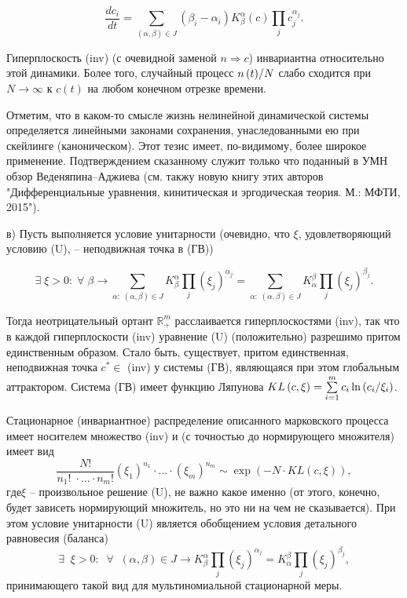 \begin{remark}
\[\tag{ГВ}
\frac{dc_i }{dt}=\sum\limits_{\left( {\alpha ,\beta } \right)\in J} {\left( 
{\beta _i -\alpha _i } \right)K_\beta ^\alpha \left( c \right)\prod\limits_j 
{c_j^{\alpha _j } } } .
\]

Гиперплоскость (inv) (с очевидной заменой $n\Rightarrow c$) инвариантна относительно этой динамики.   Более того, случайный процесс ${n\left( t \right)} \mathord{\left/ {\vphantom 
{{n\left( t \right)} N}} \right. \kern-\nulldelimiterspace} N$ слабо сходится при $N\to \infty$ 
 к $c\left( t \right)$  на любом конечном отрезке времени. 

Отметим, что в каком-то смысле жизнь нелинейной динамической 
системы определяется линейными законами сохранения, унаследованными ею при 
скейлинге (каноническом). Этот тезис имеет, по-видимому, более широкое 
применение. Подтверждением сказанному служит только что поданный в УМН обзор 
Веденяпина--Аджиева (см. такжу новую книгу этих авторов "Дифференциальные уравнения, кинитическая и эргодическая теория. М.: МФТИ, 2015"). 

в) Пусть выполняется условие унитарности (очевидно, что $\xi $, удовлетворяющий условию (U), -- неподвижная точка в (ГВ))

\[\tag{U}
\exists \;\xi >0:\;\forall \;\beta \to \sum\limits_{\alpha :\;\left( 
{\alpha ,\beta } \right)\in J} {K_\beta ^\alpha \prod\limits_j {\left( {\xi 
_j } \right)^{\alpha _j }} } =\sum\limits_{\alpha :\;\left( {\alpha ,\beta } 
\right)\in J} {K_\alpha ^\beta \prod\limits_j {\left( {\xi _j } 
\right)^{\beta _j }} } .
\]

Тогда неотрицательный ортант ${\mathbb R}_+^m $ расслаивается гиперплоскостями (inv), так что в каждой гиперплоскости (inv) уравнение (U) (положительно) разрешимо притом единственным образом. Стало быть, существует, притом единственная, неподвижная точка $c^\ast \in$ (inv) у системы (ГВ), являющаяся при этом глобальным аттрактором. Система (ГВ) имеет функцию Ляпунова $KL\left( {c,\xi } 
\right)=\sum\limits_{i=1}^m {c_i \ln \left( {{c_i } \mathord{\left/ 
{\vphantom {{c_i } {\xi _i }}} \right. \kern-\nulldelimiterspace} {\xi _i }} 
\right)} $.

Стационарное (инвариантное) распределение описанного марковского процесса имеет носителем множество (inv) и (с точностью до нормирующего множителя) имеет вид
\[
\frac{N!}{n_1 !\;\cdot \ldots \cdot n_m !}\left( \xi _1 \right)^{n_1 }\cdot \ldots\cdot \left( \xi _m  \right)^{n_m }\sim \exp \left( {-N\cdot KL\left( 
{c,\xi } \right)} \right),
\]
$где \xi $ -- произвольное решение (U), не важно какое именно (от этого, конечно, будет зависеть нормирующий множитель, но это ни на чем не сказывается). При этом условие унитарности (U) является обобщением условия детального равновесия (баланса) 
\[
\exists \;\;\xi >0:\;\;\forall \;\;\left( {\alpha ,\beta } \right)\in J\to 
K_\beta ^\alpha \prod\limits_j {\left( {\xi _j } \right)^{\alpha _j }} 
=K_\alpha ^\beta \prod\limits_j {\left( {\xi _j } \right)^{\beta _j }} ,
\]
принимающего такой вид для мультиномиальной стационарной меры.


\end{remark}
